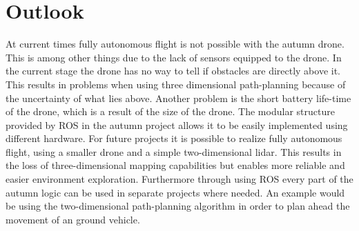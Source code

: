\section{Outlook}
At current times fully autonomous flight is not possible with the autumn drone. This is among other things due to the lack of sensors equipped to the drone. In the current stage the drone has no way to tell if obstacles are directly above it. This results in problems when using three dimensional path-planning because of the uncertainty of what lies above. Another problem is the short battery life-time of the drone, which is a result of the size of the drone.\newline
The modular structure provided by ROS in the autumn project allows it to be easily implemented using different hardware. For future projects it is possible to realize fully autonomous flight, using a smaller drone and a simple two-dimensional lidar. This results in the loss of three-dimensional mapping capabilities but enables more reliable and easier environment exploration. Furthermore through using ROS every part of the autumn logic can be used in separate projects where needed. An example would be using the two-dimensional path-planning algorithm in order to plan ahead the movement of an ground vehicle. 

\filbreak